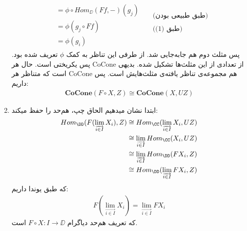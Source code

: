 \begin{enumerate}
\begin{gather*}
\begin{split}
                & = \phi \circ Hom_\DD(Ff, -) (g_j) \\
                & = \phi(g_j \circ Ff) \\
                & = \phi(g_i)
            \end{split}
            \phantom{llll}
            \begin{split}
                \text{(طبق طبیعی بودن)} \\
                 \\
                \text{(طبق (1))} \\
                \\
            \end{split}
        \end{gather*}
        پس مثلث دوم هم جابه‌جایی شد. از طرفی این تناظر به کمک $\phi$ تعریف شده بود. پس یکریختی است.
        حال هر CoCone از تعدادی از این مثلث‌ها تشکیل شده. بدیهی است که متناظر هر CoCone هم مجموعه‌ی تناظر یافته‌ی مثلث‌هایش است. پس داریم:
        \begin{gather*}
            \mathbf{CoCone}(F \circ X, Z) \cong \mathbf{CoCone}(X, UZ)
        \end{gather*}

    \item
        ابتدا نشان میدهیم الحاق چپ، هم‌حد را حفظ میکند:
        \begin{gather*}
            \begin{split}
                Hom_\DD(F(\lim_{\overrightarrow{i \in I}} X_i), Z) & \cong Hom_\CC(\lim_{\overrightarrow{i \in I}} X_i, UZ) \\
                & \cong \lim_{\overrightarrow{i \in I}} Hom_\CC(X_i, UZ) \\
                & \cong \lim_{\overrightarrow{i \in I}} Hom_\DD(FX_i, Z) \\
                & \cong Hom_\DD(\lim_{\overrightarrow{i \in I}}FX_i, Z)
            \end{split}
        \end{gather*}
        که طبق یوندا داریم:
        \begin{gather*}
            F(\lim_{\overrightarrow{i \in I}} X_i) = \lim_{\overrightarrow{i \in I}} FX_i
        \end{gather*}
        که تعریف هم‌حد دیاگرام $F \circ X: I \to \DD$ است.
\end{enumerate}